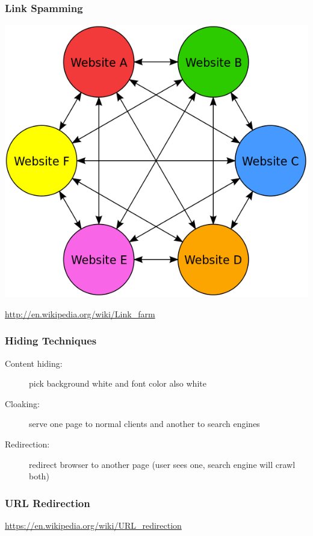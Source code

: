 \documentclass{beamer}
\begin{document}
\begin{frame} \frametitle{Link Spamming}

\includegraphics[width=.7\textwidth]{600px-Link_farm} 

\href{http://en.wikipedia.org/wiki/Link_farm}{\url{http://en.wikipedia.org/wiki/Link_farm}}  

 \end{frame}


\begin{frame}
  \frametitle{Hiding Techniques}

\begin{description}
\item [Content hiding:] pick background white and font color also white
\item [Cloaking:] serve one page to normal clients and another to
  search engines
\item [Redirection:] redirect browser to another page (user sees one, search engine
  will crawl both)
\end{description}

\end{frame}



\begin{frame}   \frametitle{URL Redirection}

\href{https://en.wikipedia.org/wiki/URL_redirection}  {\url{https://en.wikipedia.org/wiki/URL_redirection}}

\end{frame}
\end{document}

